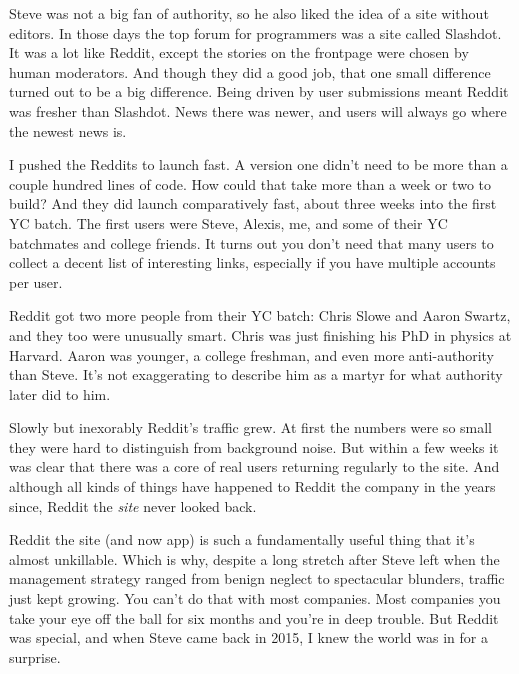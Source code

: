 Steve was not a big fan of authority,
                  so he also liked the idea of a site without editors. In those
                  days the top forum for programmers was a site called Slashdot.
                  It was a lot like Reddit, except the stories on the frontpage
                  were chosen by human moderators. And though they did a good
                  job, that one small difference turned out to be a big
                  difference. Being driven by user submissions meant Reddit was
                  fresher than Slashdot. News there was newer, and users will
                  always go where the newest news is.

I pushed the
                  Reddits to launch fast. A version one didn't need to be more
                  than a couple hundred lines of code. How could that take more
                  than a week or two to build? And they did launch comparatively
                  fast, about three weeks into the first YC batch. The first
                  users were Steve, Alexis, me, and some of their YC batchmates
                  and college friends. It turns out you don't need that many
                  users to collect a decent list of interesting links,
                  especially if you have multiple accounts per user.

Reddit
                  got two more people from their YC batch: Chris Slowe and Aaron
                  Swartz, and they too were unusually smart. Chris was just
                  finishing his PhD in physics at Harvard. Aaron was younger, a
                  college freshman, and even more anti-authority than Steve.
                  It's not exaggerating to describe him as a martyr for what
                  authority later did to him.

Slowly but inexorably
                  Reddit's traffic grew. At first the numbers were so small they
                  were hard to distinguish from background noise. But within a
                  few weeks it was clear that there was a core of real users
                  returning regularly to the site. And although all kinds of
                  things have happened to Reddit the company in the years since,
                  Reddit the \emph{site} never looked back.

Reddit
                  the site (and now app) is such a fundamentally useful thing
                  that it's almost unkillable. Which is why, despite a long
                  stretch after Steve left when the management strategy ranged
                  from benign neglect to spectacular blunders, traffic just kept
                  growing. You can't do that with most companies. Most companies
                  you take your eye off the ball for six months and you're in
                  deep trouble. But Reddit was special, and when Steve came back
                  in 2015, I knew the world was in for a surprise.

